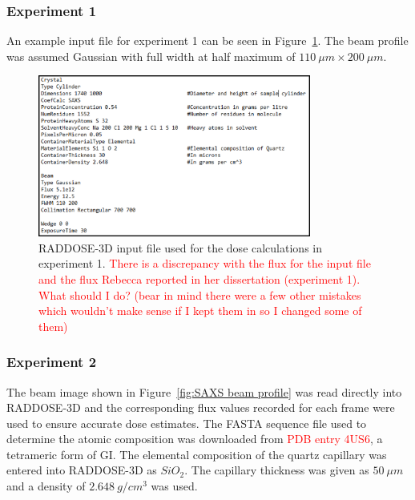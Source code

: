 \subsubsection{Experiment 1}
\label{subs:Experiment 1 - dose calc}
An example input file for experiment 1 can be seen in Figure~\ref{fig:SAXS example input - Rebecca}. The beam profile was assumed Gaussian with full width at half maximum of $110\ \mu m \times 200\ \mu m$.
\begin{figure}
    \centering
    \includegraphics[width=0.8\textwidth]{figures/saxs/rebecca_raddose_input.png}
    \caption{RADDOSE-3D input file used for the dose calculations in experiment 1. \textcolor{red}{There is a discrepancy with the flux for the input file and the flux Rebecca reported in her dissertation (experiment 1). What should I do? (bear in mind there were a few other mistakes which wouldn't make sense if I kept them in so I changed some of them)}
    }
    \label{fig:SAXS example input - Rebecca}
\end{figure}

\subsubsection{Experiment 2}
\label{subs:Experiment 2 - dose calc}
The beam image shown in Figure~\ref{fig:SAXS beam profile} was read directly into RADDOSE-3D and the corresponding flux values recorded for each frame were used to ensure accurate dose estimates.
The FASTA sequence file used to determine the atomic composition was downloaded from \textcolor{red}{PDB entry 4US6}, a tetrameric form of GI.
The elemental composition of the quartz capillary was entered into RADDOSE-3D as $SiO_2$.
The capillary thickness was given as $50\ \mu m$ and a density of $2.648\ g/cm^3$ was used.
